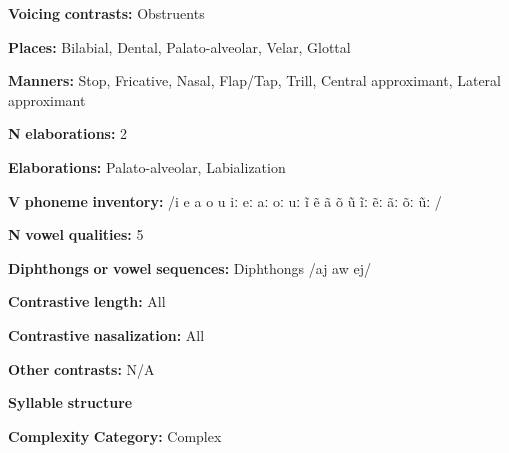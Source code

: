 \begin{styleBody}
\textbf{Voicing} \textbf{contrasts:} Obstruents
\end{styleBody}

\begin{styleBody}
\textbf{Places:} Bilabial, Dental, Palato-alveolar, Velar, Glottal
\end{styleBody}

\begin{styleBody}
\textbf{Manners:} Stop, Fricative, Nasal, Flap/Tap, Trill, Central approximant, Lateral approximant
\end{styleBody}

\begin{styleBody}
\textbf{N} \textbf{elaborations:} 2
\end{styleBody}

\begin{styleBody}
\textbf{Elaborations:} Palato-alveolar, Labialization
\end{styleBody}

\begin{styleBody}
\textbf{V} \textbf{phoneme} \textbf{inventory:} /i e a o u iː eː aː oː uː ĩ ẽ ã õ ũ ĩː ẽː ãː õː ũː /
\end{styleBody}

\begin{styleBody}
\textbf{N} \textbf{vowel} \textbf{qualities:} 5
\end{styleBody}

\begin{styleBody}
\textbf{Diphthongs} \textbf{or} \textbf{vowel} \textbf{sequences:} Diphthongs /aj aw ej/
\end{styleBody}

\begin{styleBody}
\textbf{Contrastive} \textbf{length:} All
\end{styleBody}

\begin{styleBody}
\textbf{Contrastive} \textbf{nasalization:} All
\end{styleBody}

\begin{styleBody}
\textbf{Other} \textbf{contrasts:} N/A
\end{styleBody}

\begin{styleBody}
\textbf{Syllable} \textbf{structure}
\end{styleBody}

\begin{styleBody}
\textbf{Complexity} \textbf{Category:} Complex
\end{styleBody}

